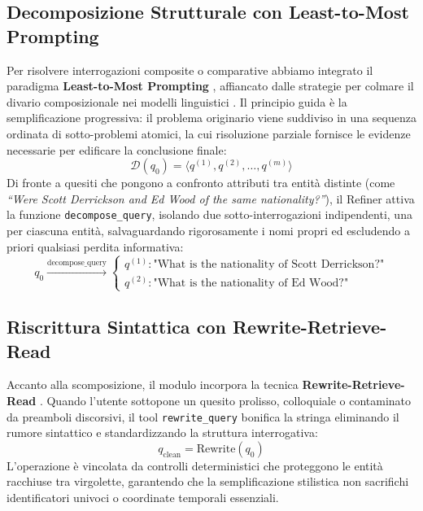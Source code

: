 \subsection{Decomposizione Strutturale con Least-to-Most Prompting}
Per risolvere interrogazioni composite o comparative abbiamo integrato il paradigma \textbf{Least-to-Most Prompting} \cite{zhou2022leasttomost}, affiancato dalle strategie per colmare il divario composizionale nei modelli linguistici \cite{press2023measuring}. Il principio guida è la semplificazione progressiva: il problema originario viene suddiviso in una sequenza ordinata di sotto-problemi atomici, la cui risoluzione parziale fornisce le evidenze necessarie per edificare la conclusione finale:
\begin{equation}
\mathcal{D}(q_0) = \langle q^{(1)}, q^{(2)}, \dots, q^{(m)} \rangle
\end{equation}
Di fronte a quesiti che pongono a confronto attributi tra entità distinte (come \textit{``Were Scott Derrickson and Ed Wood of the same nationality?''}), il Refiner attiva la funzione \texttt{decompose\_query}, isolando due sotto-interrogazioni indipendenti, una per ciascuna entità, salvaguardando rigorosamente i nomi propri ed escludendo a priori qualsiasi perdita informativa:
\begin{equation}
q_0 \xrightarrow{\text{decompose\_query}} \begin{cases}
    q^{(1)}: \text{"What is the nationality of Scott Derrickson?"} \\
    q^{(2)}: \text{"What is the nationality of Ed Wood?"}
\end{cases}
\end{equation}

\subsection{Riscrittura Sintattica con Rewrite-Retrieve-Read}
Accanto alla scomposizione, il modulo incorpora la tecnica \textbf{Rewrite-Retrieve-Read} \cite{ma2023query}. Quando l'utente sottopone un quesito prolisso, colloquiale o contaminato da preamboli discorsivi, il tool \texttt{rewrite\_query} bonifica la stringa eliminando il rumore sintattico e standardizzando la struttura interrogativa:
\begin{equation}
q_{\text{clean}} = \text{Rewrite}(q_0)
\end{equation}
L'operazione è vincolata da controlli deterministici che proteggono le entità racchiuse tra virgolette, garantendo che la semplificazione stilistica non sacrifichi identificatori univoci o coordinate temporali essenziali.

